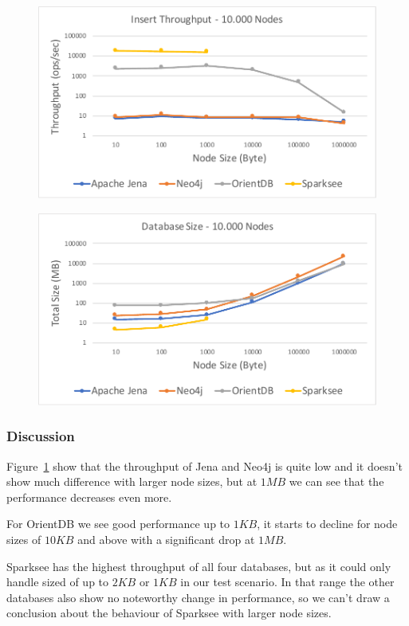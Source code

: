 \begin{figure}[h!]
  \centering
  \includegraphics[width=.75\textwidth]{images/throughput/nodeSize}
  \label{fig:nodeSize}
\end{figure}

\begin{figure}[h!]
  \centering
  \includegraphics[width=.75\textwidth]{images/throughput/sizeDatabaseSize}
  \label{fig:sizeDatabaseSize}
\end{figure}

\subsubsection{Discussion}
Figure~\ref{fig:nodeSize} show that the throughput of Jena and Neo4j is quite low and it doesn't show much difference with larger node sizes,
but at $ 1MB $ we can see that the performance decreases even more.

For OrientDB we see good performance up to $ 1KB $,
it starts to decline for node sizes of $ 10KB $ and above with a significant drop at $ 1MB $.

Sparksee has the highest throughput of all four databases,
but as it could only handle sized of up to $ 2KB $ or $ 1KB $ in our test scenario.
In that range the other databases also show no noteworthy change in performance,
so we can't draw a conclusion about the behaviour of Sparksee with larger node sizes.

